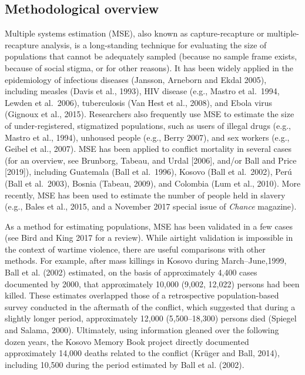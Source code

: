 \documentclass[11pt,]{article}
\begin{document}
\hypertarget{methodological-overview}{%
\subsection{Methodological overview}\label{methodological-overview}}

Multiple systems estimation (MSE), also known as capture-recapture or
multiple-recapture analysis, is a long-standing technique for evaluating
the size of populations that cannot be adequately sampled (because no
sample frame exists, because of social stigma, or for other reasons). It
has been widely applied in the epidemiology of infectious diseases
(Jansson, Arneborn and Ekdal 2005), including measles (Davis et al.,
1993), HIV disease (e.g., Mastro et al.~1994, Lewden et al.~2006),
tuberculosis (Van Hest et al., 2008), and Ebola virus (Gignoux et al.,
2015). Researchers also frequently use MSE to estimate the size of
under-registered, stigmatized populations, such as users of illegal
drugs (e.g., Mastro et al., 1994), unhoused people (e.g., Berry 2007),
and sex workers (e.g., Geibel et al., 2007). MSE has been applied to
conflict mortality in several cases (for an overview, see Brunborg,
Tabeau, and Urdal {[}2006{]}, and/or Ball and Price {[}2019{]}),
including Guatemala (Ball et al.~1996), Kosovo (Ball et al.~2002), Perú
(Ball et al.~2003), Bosnia (Tabeau, 2009), and Colombia (Lum et al.,
2010). More recently, MSE has been used to estimate the number of people
held in slavery (e.g., Bales et al., 2015, and a November 2017 special
issue of \emph{Chance} magazine).

As a method for estimating populations, MSE has been validated in a few
cases (see Bird and King 2017 for a review). While airtight validation
is impossible in the context of wartime violence, there are useful
comparisons with other methods. For example, after mass killings in
Kosovo during March--June,1999, Ball et al. (2002) estimated, on the
basis of approximately 4,400 cases documented by 2000, that
approximately 10,000 (9,002, 12,022) persons had been killed. These
estimates overlapped those of a retrospective population-based survey
conducted in the aftermath of the conflict, which suggested that during
a slightly longer period, approximately 12,000 (5,500--18,300) persons
died (Spiegel and Salama, 2000). Ultimately, using information gleaned
over the following dozen years, the Kosovo Memory Book project directly
documented approximately 14,000 deaths related to the conflict (Krüger
and Ball, 2014), including 10,500 during the period estimated by Ball et
al. (2002).
\end{document}
